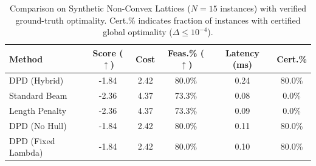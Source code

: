 \begin{table}[t]
\centering
\small
\caption{Comparison on Synthetic Non-Convex Lattices ($N=15$ instances) with verified ground-truth optimality. Cert.\% indicates fraction of instances with certified global optimality ($\Delta \le 10^{-4}$).}
\label{tab:synthetic_results}
\begin{tabular}{lccccc}
\toprule
Method & Score ($\uparrow$) & Cost & Feas.\% ($\uparrow$) & Latency (ms) & Cert.\% \\
\midrule
DPD (Hybrid) & -1.84 & 2.42 & 80.0\% & 0.24 & 80.0\% \\
Standard Beam & -2.36 & 4.37 & 73.3\% & 0.08 & 0.0\% \\
Length Penalty & -2.36 & 4.37 & 73.3\% & 0.09 & 0.0\% \\
DPD (No Hull) & -1.84 & 2.42 & 80.0\% & 0.11 & 80.0\% \\
DPD (Fixed Lambda) & -1.84 & 2.42 & 80.0\% & 0.10 & 80.0\% \\
\bottomrule
\end{tabular}
\end{table}
